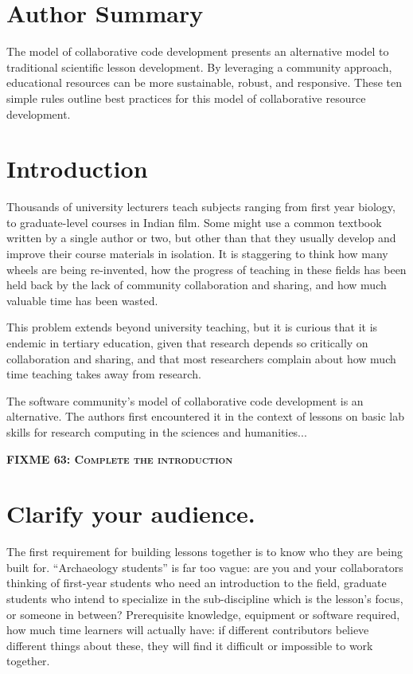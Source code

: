 \documentclass[10pt,letterpaper]{article}
\newcommand{\fixme}[2]{\textsc{\textbf{FIXME {#1}: {#2}}}}
\newcommand{\rulemajor}[1]{\section{#1}}
\begin{document}
\section*{Author Summary}

The model of collaborative code development presents an 
alternative model to traditional scientific lesson 
development. By leveraging a community approach, educational 
resources can be more sustainable, robust, and responsive. 
These ten simple rules outline best practices for this model of 
collaborative resource development.

\section*{Introduction}

Thousands of university lecturers teach subjects ranging from first year biology,
to graduate-level courses in Indian film.
Some might use a common textbook written by a single author or two,
but other than that they usually develop and improve their course materials in isolation.
It is staggering to think how many wheels are being re-invented,
how the progress of teaching in these fields has been held back by
the lack of community collaboration and sharing,
and how much valuable time has been wasted.

This problem extends beyond university teaching,
but it is curious that it is endemic in tertiary education,
given that research depends so critically on collaboration and sharing,
and that most researchers complain about how much time teaching takes away from research.

The software community's model of collaborative code development is an alternative.
The authors first encountered it in the context of
lessons on basic lab skills for research computing
in the sciences and humanities...

\fixme{63}{Complete the introduction}

\rulemajor{Clarify your audience.}

The first requirement for building lessons together is
to know who they are being built for.
``Archaeology students'' is far too vague:
are you and your collaborators thinking of
first-year students who need an introduction to the field,
graduate students who intend to specialize in the sub-discipline which is the lesson's focus,
or someone in between?
Prerequisite knowledge,
equipment or software required,
how much time learners will actually have:
if different contributors believe different things about these,
they will find it difficult or impossible to work together.
\end{document}
